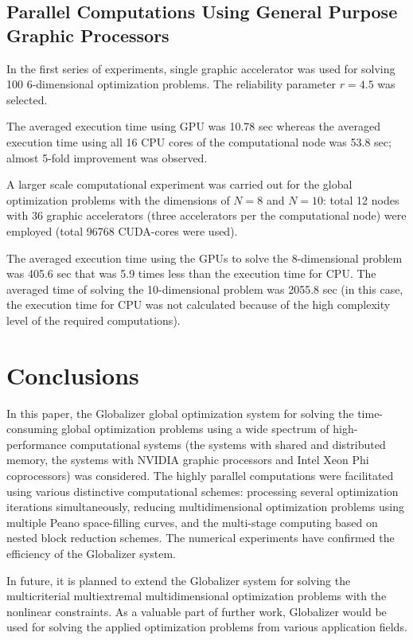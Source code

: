 \documentclass{aims}
\theoremstyle{definition}
\begin{document}
\subsection{Parallel Computations Using General Purpose Graphic Processors}
In the first series of experiments, single graphic accelerator was used for solving 100
6-dimensional optimization problems. The reliability parameter \(r=4.5\) was selected.
\par
The averaged execution time using GPU was 10.78 sec whereas the averaged execution
time using all 16 CPU cores of the computational node was 53.8 sec; almost 5-fold improvement was observed.
\par
A larger scale computational experiment was carried out for the global optimization
problems with the dimensions of \(N = 8\) and \(N = 10\): total 12 nodes with 36 graphic
accelerators (three accelerators per the computational node) were employed (total 96768 CUDA-cores were used).
\par
The averaged execution time using the GPUs to solve the 8-dimensional problem was
405.6 sec that was 5.9 times less than the execution time for CPU. The averaged time
of solving the 10-dimensional problem was 2055.8 sec (in this case, the execution time for CPU
was not calculated because of the high complexity level of the required computations).

\section{Conclusions} \label{sec:concl}

In this paper, the Globalizer global optimization system for solving the time-consuming global optimization problems using a wide spectrum of high-performance computational systems (the systems with shared and distributed memory, the systems with NVIDIA graphic processors and Intel Xeon Phi coprocessors) was considered. The highly parallel computations were facilitated using various distinctive computational schemes: processing several optimization iterations simultaneously, reducing multidimensional optimization problems using multiple Peano space-filling curves, and the multi-stage computing based on nested block reduction schemes. The numerical experiments have confirmed the efficiency of the Globalizer system.

In future, it is planned to extend the Globalizer system for solving the multicriterial multiextremal multidimensional optimization problems with the nonlinear constraints. As a valuable part of further work, Globalizer would be used for solving the applied optimization problems from various application fields.
%
%
\end{document}
